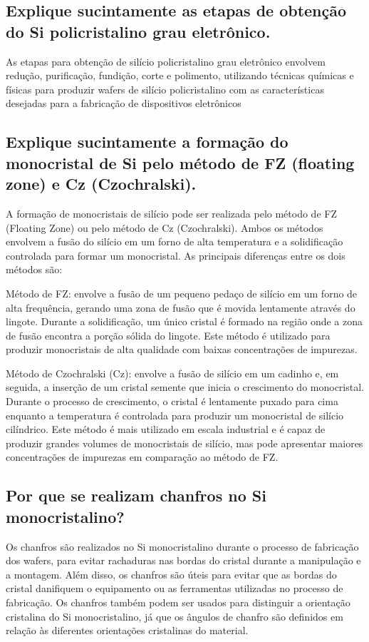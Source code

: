 \subsection{Explique sucintamente as etapas de obtenção do Si policristalino grau eletrônico.}
As etapas para obtenção de silício policristalino grau eletrônico envolvem redução, purificação, fundição, corte e polimento, utilizando técnicas químicas e físicas para produzir wafers de silício policristalino com as características desejadas para a fabricação de dispositivos eletrônicos
\subsection{Explique sucintamente a formação do monocristal de Si pelo método de FZ (floating zone) e Cz (Czochralski).}
A formação de monocristais de silício pode ser realizada pelo método de FZ (Floating Zone) ou pelo método de Cz (Czochralski). Ambos os métodos envolvem a fusão do silício em um forno de alta temperatura e a solidificação controlada para formar um monocristal. As principais diferenças entre os dois métodos são:

Método de FZ: envolve a fusão de um pequeno pedaço de silício em um forno de alta frequência, gerando uma zona de fusão que é movida lentamente através do lingote. Durante a solidificação, um único cristal é formado na região onde a zona de fusão encontra a porção sólida do lingote. Este método é utilizado para produzir monocristais de alta qualidade com baixas concentrações de impurezas.

Método de Czochralski (Cz): envolve a fusão de silício em um cadinho e, em seguida, a inserção de um cristal semente que inicia o crescimento do monocristal. Durante o processo de crescimento, o cristal é lentamente puxado para cima enquanto a temperatura é controlada para produzir um monocristal de silício cilíndrico. Este método é mais utilizado em escala industrial e é capaz de produzir grandes volumes de monocristais de silício, mas pode apresentar maiores concentrações de impurezas em comparação ao método de FZ.
\subsection{Por que se realizam chanfros no Si monocristalino?}
Os chanfros são realizados no Si monocristalino durante o processo de fabricação dos wafers, para evitar rachaduras nas bordas do cristal durante a manipulação e a montagem. Além disso, os chanfros são úteis para evitar que as bordas do cristal danifiquem o equipamento ou as ferramentas utilizadas no processo de fabricação.
Os chanfros também podem ser usados para distinguir a orientação cristalina do Si monocristalino, já que os ângulos de chanfro são definidos em relação às diferentes orientações cristalinas do material.

